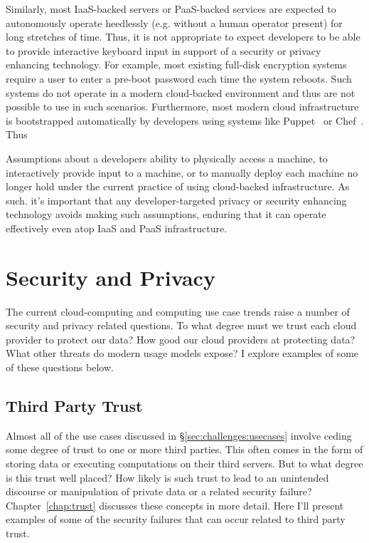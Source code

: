 Similarly, most IaaS-backed servers or PaaS-backed services are
expected to autonomously operate heedlessly (e.g. without a human
operator present) for long stretches of time. Thus, it is not
appropriate to expect developers to be able to provide interactive
keyboard input in support of a security or privacy enhancing
technology. For example, most existing full-disk encryption systems
require a user to enter a pre-boot password each time the system
reboots. Such systems do not operate in a modern cloud-backed
environment and thus are not possible to use in such
scenarios. Furthermore, most modern cloud infrastructure is
bootstrapped automatically by developers using systems like
Puppet~\cite{puppet} or Chef~\cite{chef}. Thus

Assumptions about a developers ability to physically access a machine,
to interactively provide input to a machine, or to manually deploy
each machine no longer hold under the current practice of using
cloud-backed infrastructure. As such. it's important that any
developer-targeted privacy or security enhancing technology avoids
making such assumptions, enduring that it can operate effectively even
atop IaaS and PaaS infrastructure.

\section{Security and Privacy}

The current cloud-computing and computing use case trends raise a
number of security and privacy related questions. To what degree must
we trust each cloud provider to protect our data? How good our cloud
providers at protecting data? What other threats do modern usage
models expose? I explore examples of some of these questions below.

\subsection{Third Party Trust}

Almost all of the use cases discussed in
\S\ref{sec:challenges:usecases} involve ceding some degree of trust to
one or more third parties. This often comes in the form of storing
data or executing computations on their third servers. But to what
degree is this trust well placed? How likely is such trust to lead to
an unintended discourse or manipulation of private data or a related
security failure? Chapter~\ref{chap:trust} discusses these concepts in
more detail. Here I'll present examples of some of the security
failures that can occur related to third party trust.

